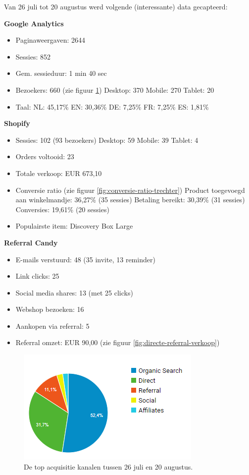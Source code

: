 Van 26 juli tot 20 augustus werd volgende (interessante) data gecapteerd:

\textbf{Google Analytics}
\begin{itemize}
	\item Paginaweergaven: 2644	
	\item Sessies: 852
	\item Gem. sessieduur: 1 min 40 sec
	\item Bezoekers: 660 (zie figuur \ref{fig:acquisitie-kanalen})
		\subitem Desktop: 370
		\subitem Mobile: 270
		\subitem Tablet: 20
	\item Taal:
		\subitem NL: 45,17\%
		\subitem EN: 30,36\%
		\subitem DE: 7,25\%
		\subitem FR: 7,25\%
		\subitem ES: 1,81\%
\end{itemize}
\textbf{Shopify}
\begin{itemize}
	\item Sessies: 102 (93 bezoekers)
		\subitem Desktop: 59
		\subitem Mobile: 39
		\subitem Tablet: 4
	\item Orders voltooid: 23
	\item Totale verkoop: EUR 673,10
	\item Conversie ratio  (zie figuur \ref{fig:conversie-ratio-trechter})
		\subitem Product toegevoegd aan winkelmandje: 36,27\% (35 sessies)
		\subitem Betaling bereikt: 30,39\% (31 sessies)
		\subitem Conversies: 19,61\% (20 sessies)
	\item Populairste item: Discovery Box Large
\end{itemize}
\textbf{Referral Candy}
\begin{itemize}
	\item E-mails verstuurd: 48 (35 invite, 13 reminder)
	\item Link clicks: 25
	\item Social media shares: 13 (met 25 clicks)
	\item Webshop bezoeken: 16
	\item Aankopen via referral: 5
	\item Referral omzet: EUR 90,00 (zie figuur \ref{fig:directe-referral-verkoop})
\end{itemize}

\begin{figure}
	\includegraphics[]{img/acquisitie-kanalen.png}
	\centering
	\caption{De top acquisitie kanalen tussen 26 juli en 20 augustus.}
	\label{fig:acquisitie-kanalen}
\end{figure}



